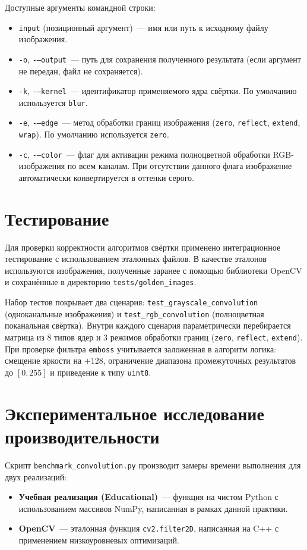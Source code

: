 \documentclass[a4paper]{article}
\begin{document}
Доступные аргументы командной строки:
\begin{itemize}
    \item \texttt{input} (позиционный аргумент)~--- имя или путь к исходному файлу изображения.
    \item \texttt{-o}, \texttt{-–output}~--- путь для сохранения полученного результата (если аргумент не передан, файл не сохраняется).
    \item \texttt{-k}, \texttt{-–kernel}~--- идентификатор применяемого ядра свёртки. По умолчанию используется \texttt{blur}.
    \item \texttt{-e}, \texttt{-–edge}~--- метод обработки границ изображения (\texttt{zero}, \texttt{reflect}, \texttt{extend}, \texttt{wrap}). По умолчанию используется \texttt{zero}.
    \item \texttt{-c}, \texttt{-–color}~--- флаг для активации режима полноцветной обработки RGB-изображения по всем каналам. При отсутствии данного флага изображение автоматически конвертируется в оттенки серого.
\end{itemize}

\section{Тестирование}

Для проверки корректности алгоритмов свёртки применено интеграционное тестирование с использованием эталонных файлов. В качестве эталонов используются изображения, полученные заранее с помощью библиотеки OpenCV и сохранённые в директорию \texttt{tests/golden\_images}.

Набор тестов покрывает два сценария: \texttt{test\_grayscale\_convolution} (одноканальные изображения) и \texttt{test\_rgb\_convolution} (полноцветная поканальная свёртка). Внутри каждого сценария параметрически перебирается матрица из 8 типов ядер и 3 режимов обработки границ (\texttt{zero}, \texttt{reflect}, \texttt{extend}). При проверке фильтра \texttt{emboss} учитывается заложенная в алгоритм логика: смещение яркости на $+128$, ограничение диапазона промежуточных результатов до $[0, 255]$ и приведение к типу \texttt{uint8}.

\section{Экспериментальное исследование производительности}
Скрипт \verb|benchmark_convolution.py| производит замеры времени выполнения для двух реализаций:
\begin{itemize}
    \item \textbf{Учебная реализация (Educational)}~--- функция на чистом Python с использованием массивов NumPy, написанная в рамках данной практики.
    \item \textbf{OpenCV}~--- эталонная функция \verb|cv2.filter2D|, написанная на C++ с применением низкоуровневых оптимизаций.
\end{itemize}
\end{document}
